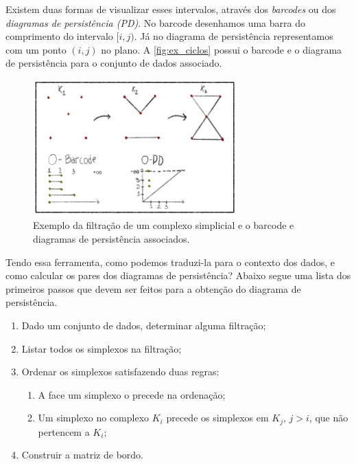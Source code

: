 Existem duas formas de visualizar esses intervalos, através dos
\textit{barcodes} ou dos \textit{diagramas de persistência (PD)}. No barcode
desenhamos uma barra do comprimento do intervalo $[i,j)$. Já no diagrama de
persistência representamos com um ponto $(i,j)$ no plano. A \autoref{fig:ex_ciclos}
possui o barcode e o diagrama de persistência para o conjunto de dados associado.

\begin{figure}[!htpb]
  \centering
  \includegraphics[width=0.7\textwidth]{images/filt_bar_pd.png}
  \caption{Exemplo da filtração de um complexo simplicial e o barcode e diagramas
  de persistência associados.}
  \label{fig:ex_ciclos}
  \fautor
\end{figure}

Tendo essa ferramenta, como podemos traduzi-la para o contexto dos dados, e
como calcular os pares dos diagramas de persistência? Abaixo segue uma lista
dos primeiros passos que devem ser feitos para a obtenção do diagrama de persistência.

\begin{enumerate}
  \item Dado um conjunto de dados, determinar alguma filtração;
  \item Listar todos os simplexos na filtração;
  \item Ordenar os simplexos satisfazendo duas regras:
  \begin{enumerate}
    \item A face um simplexo o precede na ordenação;
    \item Um simplexo no complexo $K_i$ precede os simplexos em $K_j$, $j > i$,
    que não pertencem a $K_i$;
  \end{enumerate}
  \item Construir a matriz de bordo.
\end{enumerate}

